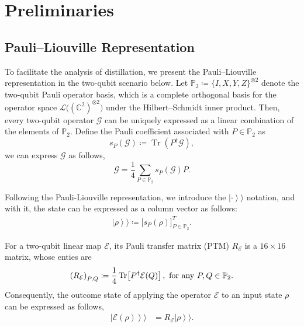 \section{Preliminaries}

\subsection{Pauli--Liouville Representation}

To facilitate the analysis of distillation, we present the Pauli--Liouville representation \cite{Lin2021} in the two-qubit scenario below.
Let
\(
\mathbb{P}_2 \coloneqq\{I,X,Y,Z\}^{ \otimes 2}
\)
denote the two-qubit Pauli operator basis, which is a
complete orthogonal basis for the operator space
$\mathcal{L}\bigl((\mathbb{C}^{2})^{\otimes 2}\bigr)$ under the
Hilbert--Schmidt inner product. Then, every two-qubit operator $\mathcal{G}$ can be uniquely expressed as a linear combination of the elements of $\mathbb P_2$.
Define the Pauli coefficient associated with
$P\in\mathbb{P}_2$ as
\begin{equation}
        s_P(\mathcal G)\coloneqq\operatorname{Tr}\!\left(P^{\dagger}\mathcal{G}\right),
\end{equation}
we can express $\mathcal{G}$ as follows,
\begin{equation}
    \mathcal{G}=\frac{1}{4}\sum_{P\in\mathbb{P}_2}s_P(\mathcal{G})P.
    \label{eq:pauli-expansion}
\end{equation}

Following the Pauli-Liouville representation,
we introduce the \(\left|\cdot\right\rangle\!\rangle\)  notation, and with it, the state can be expressed as a column vector as follows:
\begin{equation}
    \begin{aligned}
        \left|\rho\right\rangle\!\rangle
        \coloneqq\bigl[s_P(\rho)\bigr]^T_{P\in\mathbb{P}_2}.
    \end{aligned}
    \label{eq:pauli-liouville-vectors}
\end{equation}

For a two-qubit linear map \(\mathcal E\), its Pauli transfer matrix (PTM) \(R_{\mathcal E}\) is a \(16\times16\) matrix, whose enties are
\begin{equation}
    \left(R_{\mathcal E}\right)_{P,Q}
    \coloneqq\frac{1}{4}\operatorname{Tr}\!\left[P^\dagger\mathcal E(Q)\right],
    \text{ for any } P,Q\in\mathbb{P}_2.
    \label{eq:ptm-definition}
\end{equation}
Consequently, the outcome state of applying the operator \(\mathcal E\) to an input state \(\rho\) can be expressed as follows,
\begin{equation}
    \begin{aligned}
        \left|\mathcal E(\rho)\right\rangle\!\rangle
         & =R_{\mathcal E}\left|\rho\right\rangle\!\rangle.
    \end{aligned}
    \label{eq:pauli-liouville-born-rule}
\end{equation}


